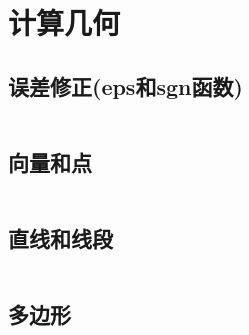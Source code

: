 \documentclass[utf8]{ctexart}
\newcommand{\cpp}[1]{\inputminted[linenos,breaklines,tabsize=4,mathescape]{c++}{#1}}
\begin{document}






\section{计算几何}

\subsection[误差修正]{误差修正(eps和sgn函数)}
\cpp{codes/computational-geometry/sgn.cpp}

\subsection{向量和点}
\cpp{codes/computational-geometry/vec.cpp}

\subsection{直线和线段}
\cpp{codes/computational-geometry/line.cpp}

\subsection{多边形}
\cpp{codes/computational-geometry/polygon.cpp}
\end{document}
